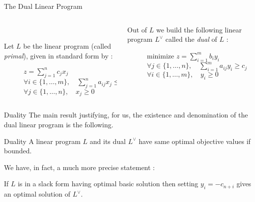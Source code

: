 \documentclass[32pt, aspectratio = 169]{beamer}
\begin{document}
\begin{frame}{The Dual Linear Program}
    \begin{columns}[T]
        \begin{column}{.5\textwidth}
            ~\vspace{.15\baselineskip}

            Let $L$ be the linear program (called \emph{primal}),
            given in standard form by :
            \begin{figure}
            \begin{linearProgG}{
                ${\displaystyle z = \sum_{j = 1 }^n c_jx_j}$
                }{
                ${\displaystyle \forall i \in \{1, \ldots, m\} , \quad \sum_{j = 1}^n a_{ij}x_j \leq b_i}$
                }{
                $\forall j \in \{1, \ldots, n\}, \quad x_j \geq 0$
                }
            \end{linearProgG}
            \end{figure}
        \end{column}
        \begin{column}{.55\textwidth}
            \begin{tcolorbox}[
                enhanced,
                parbox = false,
                colback = mLightBrown!30!white,
                colframe = mLightBrown!30!white,
                arc = 0mm,
                ]
                Out of $L$ we build the following linear program
                $L^\vee$ called the \emph{dual} of $L$ :
                \begin{figure}
                   \begin{linearProg}{
                        minimize
                        }{
                        ${\displaystyle z = \sum_{i=1}^m b_iy_i }$
                        }{
                        ${\displaystyle \forall j \in \{1, \ldots, n\}, \quad \sum_{i =1 }^m a_{ij}y_i \geq c_j}$
                        }{
                        $\forall i \in \{1, \ldots, m\}, \quad y_i \geq 0$
                        }
                    \end{linearProg}
                \end{figure}
            \end{tcolorbox}
        \end{column}
    \end{columns}
\end{frame}

\begin{frame}{Duality}
    The main result justifying, for us, the existence and denomination of the dual linear program is the following.
    \begin{alertblock}{Duality}
        A linear program $L$ and its dual $L^\vee$ have same optimal objective values if bounded.
    \end{alertblock}
    We have, in fact, a much more precise statement :
    \begin{prop}
      If $L$ is in a slack form having optimal basic solution then
      setting $y_i = -c_{n+i}$ gives an optimal solution of $L^\vee$.
    \end{prop}
\end{frame}
\end{document}
